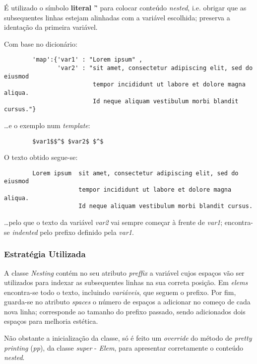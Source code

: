 \documentclass[../relatorio.tex]{subfiles}
\begin{document}
    É utilizado o símbolo \textbf{literal} '\^' para 
    colocar conteúdo \textit{nested}, i.e. obrigar que
    as subsequentes linhas estejam alinhadas com a variável 
    escolhida; preserva a identação da primeira variável.

    Com base no dicionário:

    \begin{verbatim}
        'map':{'var1' : "Lorem ipsum" , 
               'var2' : "sit amet, consectetur adipiscing elit, sed do eiusmod
                         tempor incididunt ut labore et dolore magna aliqua. 
                         Id neque aliquam vestibulum morbi blandit cursus."}
    \end{verbatim}

    \dots e o exemplo num \textit{template}:

    \begin{verbatim}
        $var1$$^$ $var2$ $^$
    \end{verbatim}
                           
    O texto obtido segue-se:
    \begin{verbatim}
        Lorem ipsum  sit amet, consectetur adipiscing elit, sed do eiusmod
                     tempor incididunt ut labore et dolore magna aliqua. 
                     Id neque aliquam vestibulum morbi blandit cursus.
    \end{verbatim}

    \dots pelo que o texto da variável \textit{var2} vai sempre começar 
    à frente de \textit{var1}; encontra-se \textit{indented} pelo prefixo 
    definido pela \textit{var1}.
    
    \subsubsection{Estratégia Utilizada}
    
    A classe \textit{Nesting} contém no seu atributo \textit{preffix} a 
    variável cujos espaços vão ser utilizados para indexar as subsequentes
    linhas na sua correta posição.
    Em \textit{elems} encontra-se todo o texto, incluindo \textit{variáveis},
    que seguem o prefixo.
    Por fim, guarda-se no atributo \textit{spaces} o número de espaços a adicionar
    no começo de cada nova linha; corresponde ao tamanho do prefixo passado,
    sendo adicionados dois espaços para melhoria estética.
    
    Não obstante a inicialização da classe, só é feito um \textit{override}
    do método de \textit{pretty printing} (\textit{pp}), da classe 
    \textit{super} - \textit{Elem}, para apresentar corretamente 
    o conteúdo \textit{nested}.
    
\end{document}
